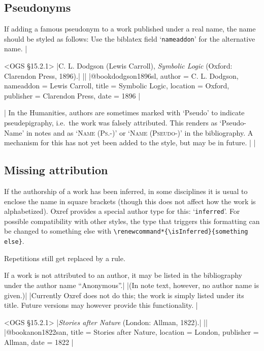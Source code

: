 \documentclass[extrafontsizes,11pt,a4paper,oneside]{memoir}
\newcommand*{\code}[1]{`\texttt{#1}'}
\def\isInferred{inferred}
\begin{document}
\subsection{Pseudonyms}

If adding a famous pseudonym to a work published under a real name,
the name should be styled as follows:
Use the \textsf{biblatex} field \code{nameaddon} for the alternative name.
|

\bibexample<OGS \S15.2.1>
|C. L. Dodgson (Lewis Carroll), \emph{Symbolic Logic} (Oxford: Clarendon Press, 1896).|%
||%
|@book{dodgson1896sl,
  author = {C. L. Dodgson},
  nameaddon = {Lewis Carroll},
  title = {Symbolic Logic},
  location = {Oxford},
  publisher = {Clarendon Press},
  date = {1896}
}|

\todoc[oxnotes]|
In the Humanities, authors are sometimes marked with ‘Pseudo’ to indicate
pseudepigraphy, i.e.\ the work was falsely attributed. This renders as
‘Pseudo-Name’ in notes and as ‘\textsc{Name (Ps.-)}’ or ‘\textsc{Name (Pseudo-)}’
in the bibliography. A mechanism for this has not yet been added to the style,
but may be in future.
|
\todoc|
\subsection{Missing attribution}

If the authorship of a work has been inferred, in some disciplines it is usual
to enclose the name in square brackets (though this does not affect how the work
is alphabetized). Oxref provides a special author type for this: \code{inferred}.
For possible compatibility with other styles, the type that triggers this formatting
can be changed to something else with \lstinline!\renewcommand*{\isInferred}{something else}!.

Repetitions still get replaced by a rule.\\

If a work is not attributed to an author, it may be listed in the bibliography
under the author name \enquote{Anonymous}.|
\todoc[oxnotes]|(In note text, however, no author name is given.)|
\todoc|Currently Oxref does not do this; the work is simply listed under its title.
Future versions may however provide this functionality.
|

\bibexample<OGS \S15.2.1>
|\emph{Stories after Nature} (London: Allman, 1822).|%
||%
|@book{anon1822san,
  title = {Stories after Nature},
  location = {London},
  publisher = {Allman},
  date = {1822}
}|
\end{document}
